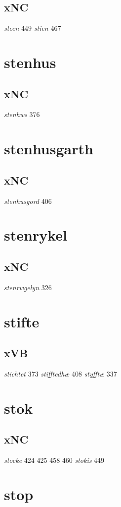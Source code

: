 \documentclass[a4paper,twocolumn]{article}
\begin{document}
\subsection{xNC}
\label{sec:orgef41699}
\emph{steen} 449 \emph{stien} 467 
\section{stenhus}
\label{sec:org015f85f}
\subsection{xNC}
\label{sec:org295717a}
\emph{stenhws} 376 
\section{stenhusgarth}
\label{sec:orgb767c06}
\subsection{xNC}
\label{sec:org4daf7a3}
\emph{stenhusgord} 406 
\section{stenrykel}
\label{sec:orgb533359}
\subsection{xNC}
\label{sec:org719e25a}
\emph{stenrwgelyn} 326 
\section{stifte}
\label{sec:orga276aa5}
\subsection{xVB}
\label{sec:org9814d79}
\emph{stichtet} 373 \emph{stifftedhæ} 408 \emph{styfftæ} 337 
\section{stok}
\label{sec:orgc80b753}
\subsection{xNC}
\label{sec:org8bdfa69}
\emph{stocke} 424 425 458 460 \emph{stokis} 449 
\section{stop}
\label{sec:orgcdedde9}
\end{document}
